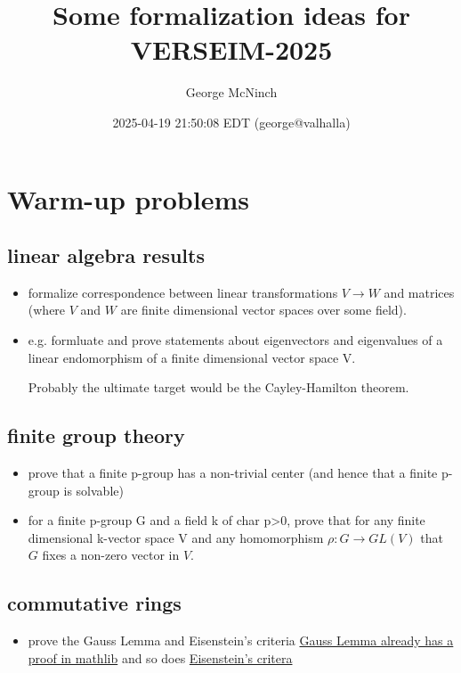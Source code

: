 \documentclass[11pt]{article}
\author{George McNinch}
\date{2025-04-19 21:50:08 EDT (george@valhalla)}
\title{Some formalization ideas for VERSEIM-2025}
\numberwithin{equation}{section}
\begin{document}
\maketitle
\setcounter{tocdepth}{2}
\tableofcontents

\section{Warm-up problems}
\label{sec:warm-up-problems-}
\subsection{linear algebra results}
\label{sec:linear-algebra-results}
\begin{itemize}
\item formalize correspondence between linear transformations \(V \to W\)
and matrices (where \(V\) and \(W\) are finite dimensional vector spaces
over some field).

\item e.g. formluate and prove statements about eigenvectors and
eigenvalues of a linear endomorphism of a finite dimensional vector
space V.

Probably the ultimate target would be the Cayley-Hamilton theorem.
\end{itemize}
\subsection{finite group theory}
\label{sec:finite-group-theory}
\begin{itemize}
\item prove that a finite p-group has a non-trivial center (and hence that
a finite p-group is solvable)

\item for a finite p-group G and a field k of char p>0, prove that for any
finite dimensional k-vector space V and any homomorphism \(\rho:G
  \to GL(V)\) that \(G\) fixes a non-zero vector in \(V\).
\end{itemize}
\subsection{commutative rings}
\label{sec:commutative-rings}
\begin{itemize}
\item prove the Gauss Lemma and Eisenstein's criteria
\href{https://leanprover-community.github.io/mathlib4\_docs/Mathlib/RingTheory/Polynomial/Content.html\#Polynomial.content}{Gauss Lemma already has a proof in mathlib}
and so does \href{https://leanprover-community.github.io/mathlib4\_docs/Mathlib/RingTheory/Polynomial/Eisenstein/Basic.html\#Polynomial.IsEisensteinAt.irreducible}{Eisenstein's critera}
\end{itemize}
\end{document}
